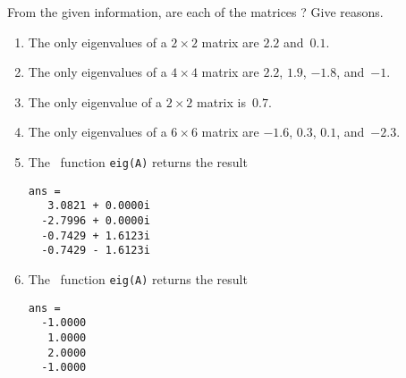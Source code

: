 \begin{exercise}  
From the given information, are each of the matrices ?  
Give reasons.
\begin{enumerate}
\item The only eigenvalues of a \(2\times2\) matrix are \(2.2\) and~\(0.1\).

\item The only eigenvalues of a \(4\times4\) matrix are \(2.2\), \(1.9\), \(-1.8\), and~\(-1\).

\item The only eigenvalue of a \(2\times2\) matrix is~\(0.7\).

\item The only eigenvalues of a \(6\times6\) matrix are \(-1.6\), \(0.3\), \(0.1\), and~\(-2.3\).


\item The \script\ function \verb|eig(A)| returns the result
\begin{verbatim}
ans =
   3.0821 + 0.0000i
  -2.7996 + 0.0000i
  -0.7429 + 1.6123i
  -0.7429 - 1.6123i
\end{verbatim}

\item The \script\ function \verb|eig(A)| returns the result
\begin{verbatim}
ans =
  -1.0000
   1.0000
   2.0000
  -1.0000
\end{verbatim}

\end{enumerate}
\end{exercise}




